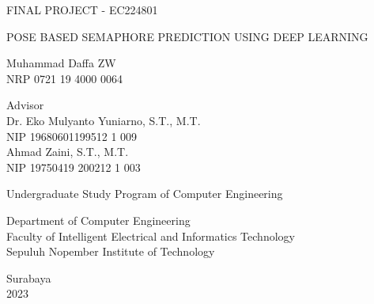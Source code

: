 \begin{large}
  FINAL PROJECT - EC224801
\end{large}

\vspace{\fill}

\begin{spacing}{1.5}
  \begin{Large}
    POSE BASED SEMAPHORE PREDICTION USING DEEP LEARNING
  \end{Large}
\end{spacing}

\vspace{\fill}

\begin{large}
  Muhammad Daffa ZW \\
  \textmd{NRP 0721 19 4000 0064 }
\end{large}

\vspace{\fill}

\begin{large}
  \textmd{Advisor} \\
   Dr. Eko Mulyanto Yuniarno, S.T., M.T. \\
  \textmd{NIP 19680601199512 1 009} \\
  Ahmad Zaini, S.T., M.T. \\
  \textmd{NIP 19750419 200212 1 003}
\end{large}

\vspace{\fill}

Undergraduate Study Program of Computer Engineering \\

\mdseries

Department of Computer Engineering \\
Faculty of Intelligent Electrical and Informatics Technology \\
Sepuluh Nopember Institute of Technology

Surabaya \\
2023

